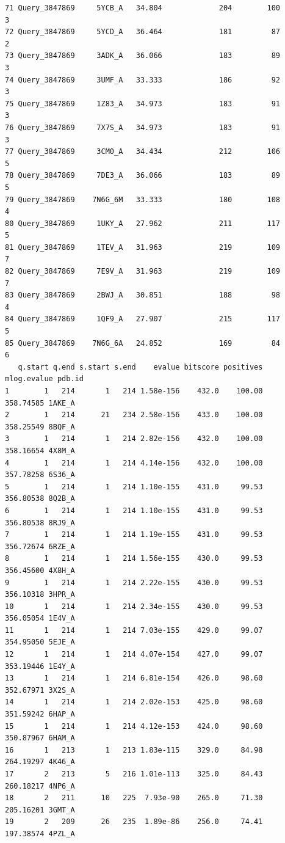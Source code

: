 \documentclass[
  letterpaper,
  DIV=11,
  numbers=noendperiod]{scrartcl}
\begin{document}
\begin{verbatim}
71 Query_3847869     5YCB_A   34.804             204        100        3
72 Query_3847869     5YCD_A   36.464             181         87        2
73 Query_3847869     3ADK_A   36.066             183         89        3
74 Query_3847869     3UMF_A   33.333             186         92        3
75 Query_3847869     1Z83_A   34.973             183         91        3
76 Query_3847869     7X7S_A   34.973             183         91        3
77 Query_3847869     3CM0_A   34.434             212        106        5
78 Query_3847869     7DE3_A   36.066             183         89        5
79 Query_3847869    7N6G_6M   33.333             180        108        4
80 Query_3847869     1UKY_A   27.962             211        117        5
81 Query_3847869     1TEV_A   31.963             219        109        7
82 Query_3847869     7E9V_A   31.963             219        109        7
83 Query_3847869     2BWJ_A   30.851             188         98        4
84 Query_3847869     1QF9_A   27.907             215        117        5
85 Query_3847869    7N6G_6A   24.852             169         84        6
   q.start q.end s.start s.end    evalue bitscore positives mlog.evalue pdb.id
1        1   214       1   214 1.58e-156    432.0    100.00   358.74585 1AKE_A
2        1   214      21   234 2.58e-156    433.0    100.00   358.25549 8BQF_A
3        1   214       1   214 2.82e-156    432.0    100.00   358.16654 4X8M_A
4        1   214       1   214 4.14e-156    432.0    100.00   357.78258 6S36_A
5        1   214       1   214 1.10e-155    431.0     99.53   356.80538 8Q2B_A
6        1   214       1   214 1.10e-155    431.0     99.53   356.80538 8RJ9_A
7        1   214       1   214 1.19e-155    431.0     99.53   356.72674 6RZE_A
8        1   214       1   214 1.56e-155    430.0     99.53   356.45600 4X8H_A
9        1   214       1   214 2.22e-155    430.0     99.53   356.10318 3HPR_A
10       1   214       1   214 2.34e-155    430.0     99.53   356.05054 1E4V_A
11       1   214       1   214 7.03e-155    429.0     99.07   354.95050 5EJE_A
12       1   214       1   214 4.07e-154    427.0     99.07   353.19446 1E4Y_A
13       1   214       1   214 6.81e-154    426.0     98.60   352.67971 3X2S_A
14       1   214       1   214 2.02e-153    425.0     98.60   351.59242 6HAP_A
15       1   214       1   214 4.12e-153    424.0     98.60   350.87967 6HAM_A
16       1   213       1   213 1.83e-115    329.0     84.98   264.19297 4K46_A
17       2   213       5   216 1.01e-113    325.0     84.43   260.18217 4NP6_A
18       2   211      10   225  7.93e-90    265.0     71.30   205.16201 3GMT_A
19       2   209      26   235  1.89e-86    256.0     74.41   197.38574 4PZL_A

\end{verbatim}
\end{document}
